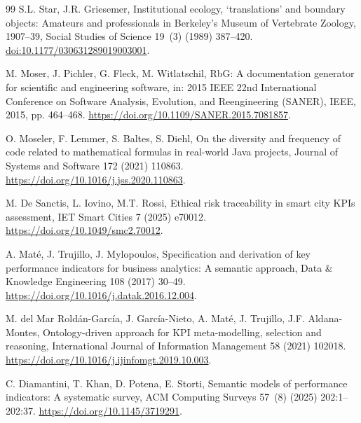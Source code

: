 \documentclass[a4paper,fleqn]{cas-dc}
\begin{document}
\begin{thebibliography}{99}
S.L. Star, J.R. Griesemer,
\newblock Institutional ecology, `translations' and boundary objects: Amateurs and professionals in Berkeley's Museum of Vertebrate Zoology, 1907--39,
\newblock Social Studies of Science 19~(3) (1989) 387--420.
\newblock \href{https://doi.org/10.1177/030631289019003001}{doi:10.1177/030631289019003001}.


M. Moser, J. Pichler, G. Fleck, M. Witlatschil,
\newblock RbG: A documentation generator for scientific and engineering software,
\newblock in: 2015 IEEE 22nd International Conference on Software Analysis, Evolution, and Reengineering (SANER), IEEE, 2015, pp. 464--468.
\newblock \url{https://doi.org/10.1109/SANER.2015.7081857}.

O. Moseler, F. Lemmer, S. Baltes, S. Diehl,
\newblock On the diversity and frequency of code related to mathematical formulas in real-world Java projects,
\newblock Journal of Systems and Software 172 (2021) 110863.
\newblock \url{https://doi.org/10.1016/j.jss.2020.110863}.

M. De Sanctis, L. Iovino, M.T. Rossi,
\newblock Ethical risk traceability in smart city KPIs assessment,
\newblock IET Smart Cities 7 (2025) e70012.
\newblock \url{https://doi.org/10.1049/smc2.70012}.


A. Mat\'e, J. Trujillo, J. Mylopoulos,
\newblock Specification and derivation of key performance indicators for business analytics: A semantic approach,
\newblock Data \& Knowledge Engineering 108 (2017) 30--49.
\newblock \url{https://doi.org/10.1016/j.datak.2016.12.004}.

M. del Mar Rold\'an-Garc\'ia, J. Garc\'ia-Nieto, A. Mat\'e, J. Trujillo, J.F. Aldana-Montes,
\newblock Ontology-driven approach for KPI meta-modelling, selection and reasoning,
\newblock International Journal of Information Management 58 (2021) 102018.
\newblock \url{https://doi.org/10.1016/j.ijinfomgt.2019.10.003}.

C. Diamantini, T. Khan, D. Potena, E. Storti,
\newblock Semantic models of performance indicators: A systematic survey,
\newblock ACM Computing Surveys 57~(8) (2025) 202:1--202:37.
\newblock \url{https://doi.org/10.1145/3719291}.


\end{thebibliography}
\end{document}

